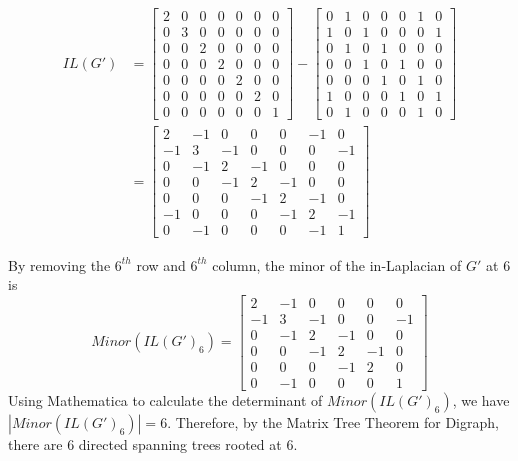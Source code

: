 \documentclass[twoside,11pt]{article}
\numberwithin{equation}{section} \DeclareMathOperator{\Var}{Var}
\begin{document}
\begin{equation*} 
\begin{split}
IL(G') & = 
\begin{bmatrix}
2 & 0 & 0 & 0 & 0 & 0 & 0\\
0 & 3 & 0 & 0 & 0 & 0 & 0\\
0 & 0 & 2 & 0 & 0 & 0 & 0\\
0 & 0 & 0 & 2 & 0 & 0 & 0\\
0 & 0 & 0 & 0 & 2 & 0 & 0\\
0 & 0 & 0 & 0 & 0 & 2 & 0\\
0 & 0 & 0 & 0 & 0 & 0 & 1
\end{bmatrix} - 
\begin{bmatrix}
0 & 1 & 0 & 0 & 0 & 1 & 0\\
1 & 0 & 1 & 0 & 0 & 0 & 1\\
0 & 1 & 0 & 1 & 0 & 0 & 0\\
0 & 0 & 1 & 0 & 1 & 0 & 0\\
0 & 0 & 0 & 1 & 0 & 1 & 0\\
1 & 0 & 0 & 0 & 1 & 0 & 1\\
0 & 1 & 0 & 0 & 0 & 1 & 0
\end{bmatrix} \\
 & = \begin{bmatrix}
2 & -1 & 0 & 0 & 0 & -1 & 0\\
-1 & 3 & -1 & 0 & 0 & 0 & -1\\
0 & -1 & 2 & -1 & 0 & 0 & 0\\
0 & 0 & -1 & 2 & -1 & 0 & 0\\
0 & 0 & 0 & -1 & 2 & -1 & 0\\
-1 & 0 & 0 & 0 & -1 & 2 & -1\\
0 & -1 & 0 & 0 & 0 & -1 & 1
\end{bmatrix}
\end{split}
\end{equation*}

By removing the $6^{th}$ row and $6^{th}$ column, the minor of the in-Laplacian of $G'$ at 6  is
\[Minor(IL(G')_6)=
\begin{bmatrix}
2 & -1 & 0 & 0 & 0  & 0\\
-1 & 3 & -1 & 0 & 0 &  -1\\
0 & -1 & 2 & -1 & 0 &  0\\
0 & 0 & -1 & 2 & -1 &  0\\
0 & 0 & 0 & -1 & 2 &  0\\
0 & -1 & 0 & 0 & 0 &  1
\end{bmatrix}
\]
Using Mathematica to calculate the determinant of $Minor(IL(G')_6)$, we have $|Minor(IL(G')_6)|=6$.
Therefore, by the Matrix Tree Theorem for Digraph, there are 6 directed spanning trees rooted at $6$. 
\end{document}
